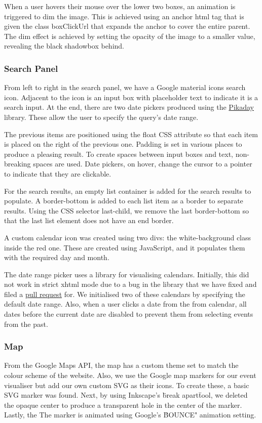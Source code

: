 \documentclass[10pt]{article}
\begin{document}
                When a user hovers their mouse over the lower two boxes, an animation is triggered to dim the image. This is achieved using an anchor html tag that is given the class boxClickUrl that expands the anchor to cover the entire parent. The dim effect is achieved by setting the opacity of the image to a smaller value, revealing the black shadowbox behind.

            \subsubsection{Search Panel}
                From left to right in the search panel, we have a Google material icons search icon. Adjacent to the icon is an input box with placeholder text to indicate it is a search input. At the end, there are two date pickers produced using the \href{https://github.com/dbushell/Pikaday}{Pikaday} library. These allow the user to specify the query's date range.

                The previous items are positioned using the float CSS attribute so that each item is placed on the right of the previous one. Padding is set in various places to produce a pleasing result.  To create spaces between input boxes and text, non-breaking spaces are used. Date pickers, on hover, change the cursor to a pointer to indicate that they are clickable.

                For the search results, an empty list container is added for the search results to populate. A border-bottom is added to each list item as a border to separate results. Using the CSS selector last-child, we remove the last border-bottom so that the last list element does not have an end border.

                A custom calendar icon was created using two divs: the white-background class inside the red one. These are created using JavaScript, and it populates them with the required day and month.

                The date range picker uses a library for visualising calendars. Initially, this did not work in strict xhtml mode due to a bug in the library that we have fixed and filed a \href{https://github.com/dbushell/Pikaday/pull/526}{pull request} for. We initialised two of these calendars by specifying the default date range. Also, when a user clicks a date from the from calendar, all dates before the current date are disabled to prevent them from selecting events from the past.

            \subsubsection{Map}
                From the Google Maps API, the map has a custom theme set to match the colour scheme of the  website. Also, we use the Google map markers for our event visualiser but add our own custom SVG as their icons. To create these, a basic SVG marker was found. Next, by using Inkscape's \"break apart\" tool, we deleted the opaque center to produce a transparent hole in the center of the marker. Lastly, the The marker is animated using Google's \"BOUNCE" animation setting.
\end{document}

